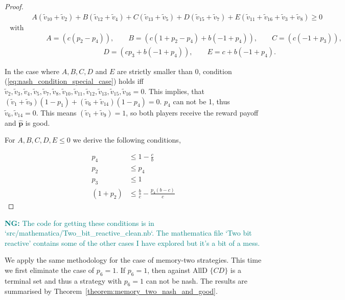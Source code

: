 \documentclass{article}
\theoremstyle{definition}
\newcommand{\nikoleta}[1]{\textcolor{teal}{{\bf NG:} #1}}
\begin{document}
\begin{proof}
  \begin{align}
    & A (\tilde{v}_{10} + \tilde{v}_{2}) + B (\tilde{v}_{12} + \tilde{v}_4) 
    + C (\tilde{v}_{13} + \tilde{v}_5) + D (\tilde{v}_{15} + \tilde{v}_7) + E (\tilde{v}_{11} + \tilde{v}_{16} + \tilde{v}_3 + \tilde{v}_8) \geq  0 \label{eq:nash_condition_special_case} \\ \text{ with } \nonumber \\ 
    & \qquad A = (c (p_2 - p_4)), \qquad B = (c (1 + p_2 - p_4) + b (-1 + p_4)), \qquad C = ( c (-1 + p_3)),  \nonumber \\
    & \qquad  \qquad  \qquad \qquad \qquad D = (c p_3 + b (-1 + p_4)), \qquad E = c + 
    b (-1 + p_4). \nonumber
  \end{align}
  
  In the case where \(A, B, C, D\) and \(E\) are strictly smaller than 0, condition
  (\ref{eq:nash_condition_special_case}) holds iff \(\tilde{v}_2, \tilde{v}_3,
  \tilde{v}_4, \tilde{v}_5, \tilde{v}_7, \tilde{v}_8, \tilde{v}_{10},
  \tilde{v}_{11}, \tilde{v}_{12}, \tilde{v}_{13}, \tilde{v}_{15}, \tilde{v}_{16} =
  0\). This implies, that \((\tilde{v}_1 + \tilde{v}_9) (1 - p_1) + (\tilde{v}_6 +
  \tilde{v}_{14}) (1 - p_4) = 0\). \(p_4\) can not be 1, thus \(\tilde{v}_6,
  \tilde{v}_{14} = 0\). This means \((\tilde{v}_1 + \tilde{v}_9) = 1\), so both
  players receive the reward payoff and \(\mathbf{\hat{p}}\) is good.
  
  For \(A, B, C, D, E \leq 0\) we derive the following conditions,
  
  \begin{align}\label{eq:nash_conditions}
    p_4       & \leq 1 - \frac{c}{b} \\
    p_2       & \leq p_4 \\
    p_3       & \leq 1 \\
    (1 + p_2) & \leq \frac{b}{c} - \frac{p_4 (b - c)}{c}
  \end{align}
  
  \end{proof}
  
\nikoleta{The code for getting these conditions is in `src/mathematica/Two\_bit\_reactive\_clean.nb`.
The mathematica file `Two bit reactive' contains some of the other cases I have
explored but it's a bit of a mess.}

We apply the same methodology for the case of memory-two strategies. This time
we first eliminate the case of \(p_6 = 1\). If \(p_6 = 1\), then against AllD
\(\{CD\}\) is a terminal set and thus a strategy with \(p_6 = 1\) can not be
nash. The results
are summarised by Theorem~\ref{theorem:memory_two_nash_and_good}.
  
\end{document}
